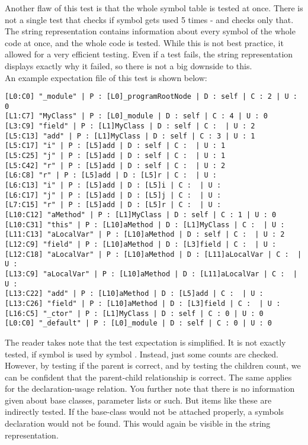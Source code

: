 Another flaw of this test is that the whole symbol table is tested at once.
There is not a single test that checks if symbol  gets used 5 times - and checks only that.
The string representation contains information about every symbol of the whole code at once, and the whole code is tested.
While this is not best practice, it allowed for a very efficient testing.
Even if a test fails, the string representation displays exactly why it failed, so there is not a big downside to this.\\

An example expectation file of this test is shown below:

\begin{verbatim}
[L0:C0] "_module" | P : [L0]_programRootNode | D : self | C : 2 | U : 0
[L1:C7] "MyClass" | P : [L0]_module | D : self | C : 4 | U : 0
[L3:C9] "field" | P : [L1]MyClass | D : self | C :  | U : 2
[L5:C13] "add" | P : [L1]MyClass | D : self | C : 3 | U : 1
[L5:C17] "i" | P : [L5]add | D : self | C :  | U : 1
[L5:C25] "j" | P : [L5]add | D : self | C :  | U : 1
[L5:C42] "r" | P : [L5]add | D : self | C :  | U : 2
[L6:C8] "r" | P : [L5]add | D : [L5]r | C :  | U :
[L6:C13] "i" | P : [L5]add | D : [L5]i | C :  | U :
[L6:C17] "j" | P : [L5]add | D : [L5]j | C :  | U :
[L7:C15] "r" | P : [L5]add | D : [L5]r | C :  | U :
[L10:C12] "aMethod" | P : [L1]MyClass | D : self | C : 1 | U : 0
[L10:C31] "this" | P : [L10]aMethod | D : [L1]MyClass | C :  | U :
[L11:C13] "aLocalVar" | P : [L10]aMethod | D : self | C :  | U : 2
[L12:C9] "field" | P : [L10]aMethod | D : [L3]field | C :  | U :
[L12:C18] "aLocalVar" | P : [L10]aMethod | D : [L11]aLocalVar | C :  | U :
[L13:C9] "aLocalVar" | P : [L10]aMethod | D : [L11]aLocalVar | C :  | U :
[L13:C22] "add" | P : [L10]aMethod | D : [L5]add | C :  | U :
[L13:C26] "field" | P : [L10]aMethod | D : [L3]field | C :  | U :
[L16:C5] "_ctor" | P : [L1]MyClass | D : self | C : 0 | U : 0
[L0:C0] "_default" | P : [L0]_module | D : self | C : 0 | U : 0
\end{verbatim}

The reader takes note that the test expectation is simplified.
It is not exactly tested, if symbol  is used by symbol .
Instead, just some counts are checked.
However, by testing if the parent is correct, and by testing the children count, we can be confident that the parent-child relationship is correct.
The same applies for the declaration-usage relation.
You further note that there is no information given about base classes, parameter lists or such.
But items like these are indirectly tested.
If the base-class would not be attached properly,
a symbols declaration would not be found.
This would again be visible in the string representation.\\


